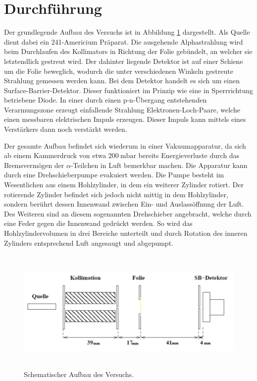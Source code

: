 \section{Durchführung}
\label{sec:Durchführung}

Der grundlegende Aufbau des Versuchs ist in Abbildung \ref{fig:aufbau} dargestellt.
Als Quelle dient dabei ein 241-Americium Präparat. Die ausgehende Alphastrahlung
wird beim Durchlaufen des Kollimators in Richtung der Folie gebündelt, an welcher
sie letztendlich gestreut wird. Der dahinter liegende Detektor ist auf einer Schiene
um die Folie beweglich, wodurch die unter verschiedenen Winkeln gestreute Strahlung
gemessen werden kann. Bei dem Detektor handelt es sich um einen Surface-Barrier-Detektor.
Dieser funktioniert im Prinzip wie eine in Sperrrichtung betriebene Diode. In einer durch einen p-n-Übergang
entstehenden Verarmungszone erzeugt einfallende Strahlung Elektronen-Loch-Paare,
welche einen messbaren elektrischen Impuls erzeugen. Dieser Impuls kann mittels eines
Verstärkers dann noch verstärkt werden.

Der gesamte Aufbau befindet sich wiederum in einer Vakuumapparatur, da sich ab einem
Kammerdruck von etwa $\SI{200}{\milli\bar}$ bereits Energieverluste durch das Bremsvermögen
der $\alpha$-Teilchen in Luft bemerkbar machen.
Die Apparatur kann durch eine Drehschieberpumpe evakuiert werden. Die Pumpe besteht im Wesentlichen
aus einem Hohlzylinder, in dem ein weiterer Zylinder rotiert. Der rotierende Zylinder
befindet sich jedoch nicht mittig in dem Hohlzylinder, sondern berührt dessen Innenwand
zwischen Ein- und Auslassöffnung der Luft. Des Weiteren sind an diesem sogenannten
Drehschieber angebracht, welche durch eine Feder gegen die Innenwand gedrückt werden.
So wird das Hohlzylindervolumen in drei Bereiche unterteilt und durch Rotation des
inneren Zylinders entsprechend Luft angesaugt und abgepumpt.

\begin{figure}[H]
  \centering
  \includegraphics[height=6cm]{Aufbau.PNG}
  \caption{Schematischer Aufbau des Versuchs. \cite{sample1}}
  \label{fig:aufbau}
\end{figure}

